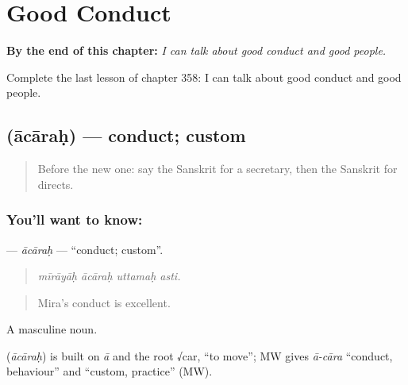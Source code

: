 
\chapter{Good Conduct}
\label{ch:sa-good-conduct}

\begin{chapteropening}
\textbf{By the end of this chapter:} \emph{I can talk about good conduct and good people.}

Complete the last lesson of chapter 358: I can talk about good conduct and good people.
\end{chapteropening}

\section[\texorpdfstring{\sk{आचारः} (ācāraḥ)}{आचारः (ācāraḥ)}]{ (ācāraḥ) — conduct; custom}

\label{lesson:SA-C358-acarah}



\begin{quote}
Before the new one: say the Sanskrit for a secretary, then the Sanskrit for directs.
\end{quote}

\subsection*{You'll want to know: }
\textbf{} — \emph{ācāraḥ} — \textquotedblleft{}conduct; custom\textquotedblright{}.

\begin{quote}
   
\end{quote}

\begin{quote}
\emph{mīrāyāḥ ācāraḥ uttamaḥ asti.}
\end{quote}

\begin{quote}
Mira's conduct is excellent.
\end{quote}

A masculine noun.

\begin{cousinweb}
\textbf{} (\emph{ācāraḥ}) is built on \emph{ā} and the root √car, \textquotedblleft{}to move\textquotedblright{}; MW gives \emph{ā-cāra} \textquotedblleft{}conduct, behaviour\textquotedblright{} and \textquotedblleft{}custom, practice\textquotedblright{} (MW).
\end{cousinweb}


